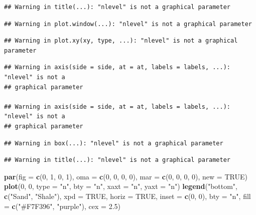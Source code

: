 \documentclass[
]{article}
\newenvironment{Shaded}{\begin{snugshade}}{\end{snugshade}}
\newcommand{\DataTypeTok}[1]{\textcolor[rgb]{0.13,0.29,0.53}{#1}}
\newcommand{\DecValTok}[1]{\textcolor[rgb]{0.00,0.00,0.81}{#1}}
\newcommand{\FloatTok}[1]{\textcolor[rgb]{0.00,0.00,0.81}{#1}}
\newcommand{\KeywordTok}[1]{\textcolor[rgb]{0.13,0.29,0.53}{\textbf{#1}}}
\newcommand{\NormalTok}[1]{#1}
\newcommand{\OtherTok}[1]{\textcolor[rgb]{0.56,0.35,0.01}{#1}}
\newcommand{\StringTok}[1]{\textcolor[rgb]{0.31,0.60,0.02}{#1}}
\begin{document}
\begin{verbatim}
## Warning in title(...): "nlevel" is not a graphical parameter
\end{verbatim}

\begin{verbatim}
## Warning in plot.window(...): "nlevel" is not a graphical parameter
\end{verbatim}

\begin{verbatim}
## Warning in plot.xy(xy, type, ...): "nlevel" is not a graphical parameter
\end{verbatim}

\begin{verbatim}
## Warning in axis(side = side, at = at, labels = labels, ...): "nlevel" is not a
## graphical parameter

## Warning in axis(side = side, at = at, labels = labels, ...): "nlevel" is not a
## graphical parameter
\end{verbatim}

\begin{verbatim}
## Warning in box(...): "nlevel" is not a graphical parameter
\end{verbatim}

\begin{verbatim}
## Warning in title(...): "nlevel" is not a graphical parameter
\end{verbatim}

\begin{Shaded}
\begin{Highlighting}[]
\KeywordTok{par}\NormalTok{(}\DataTypeTok{fig =} \KeywordTok{c}\NormalTok{(}\DecValTok{0}\NormalTok{, }\DecValTok{1}\NormalTok{, }\DecValTok{0}\NormalTok{, }\DecValTok{1}\NormalTok{), }\DataTypeTok{oma =} \KeywordTok{c}\NormalTok{(}\DecValTok{0}\NormalTok{, }\DecValTok{0}\NormalTok{, }\DecValTok{0}\NormalTok{, }\DecValTok{0}\NormalTok{), }\DataTypeTok{mar =} \KeywordTok{c}\NormalTok{(}\DecValTok{0}\NormalTok{, }\DecValTok{0}\NormalTok{, }\DecValTok{0}\NormalTok{, }\DecValTok{0}\NormalTok{), }\DataTypeTok{new =} \OtherTok{TRUE}\NormalTok{)}
\KeywordTok{plot}\NormalTok{(}\DecValTok{0}\NormalTok{, }\DecValTok{0}\NormalTok{, }\DataTypeTok{type =} \StringTok{"n"}\NormalTok{, }\DataTypeTok{bty =} \StringTok{"n"}\NormalTok{, }\DataTypeTok{xaxt =} \StringTok{"n"}\NormalTok{, }\DataTypeTok{yaxt =} \StringTok{"n"}\NormalTok{)}
\KeywordTok{legend}\NormalTok{(}\StringTok{"bottom"}\NormalTok{, }\KeywordTok{c}\NormalTok{(}\StringTok{"Sand"}\NormalTok{, }\StringTok{"Shale"}\NormalTok{), }\DataTypeTok{xpd =} \OtherTok{TRUE}\NormalTok{, }\DataTypeTok{horiz =} \OtherTok{TRUE}\NormalTok{, }\DataTypeTok{inset =} \KeywordTok{c}\NormalTok{(}\DecValTok{0}\NormalTok{, }
    \DecValTok{0}\NormalTok{), }\DataTypeTok{bty =} \StringTok{"n"}\NormalTok{, }\DataTypeTok{fill =} \KeywordTok{c}\NormalTok{(}\StringTok{"#F7F396"}\NormalTok{, }\StringTok{"purple"}\NormalTok{), }\DataTypeTok{cex =} \FloatTok{2.5}\NormalTok{)}
\end{Highlighting}
\end{Shaded}
\end{document}
